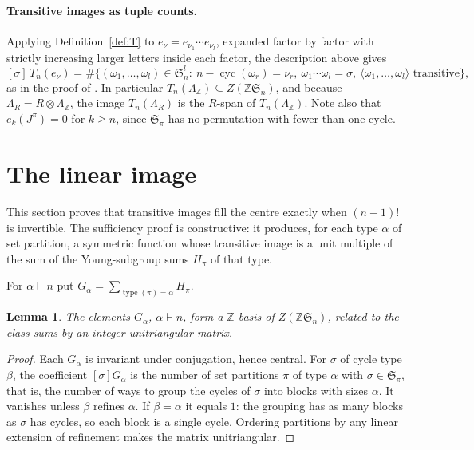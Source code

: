 \documentclass[11pt,a4paper]{article}
\newtheorem{lemma}[theorem]{Lemma}
\theoremstyle{definition}
\newcommand{\Sn}{\mathfrak S}
\newcommand{\Z}{\mathbb Z}
\DeclareMathOperator{\cyc}{cyc}
\DeclareMathOperator{\type}{type}
\begin{document}
\paragraph{Transitive images as tuple counts.} Applying Definition~\ref{def:T} to $e_\nu=e_{\nu_1}\cdots e_{\nu_l}$, expanded factor by factor with strictly increasing larger letters inside each factor, the description above gives
\begin{equation}\label{eq:count}
 [\sigma]\,T_n(e_\nu)=\#\bigl\{(\omega_1,\ldots,\omega_l)\in\Sn_n^l:\ n-\cyc(\omega_r)=\nu_r,\ \omega_1\cdots\omega_l=\sigma,\ \langle\omega_1,\ldots,\omega_l\rangle\text{ transitive}\bigr\},
\end{equation}
as in the proof of \cite[Theorem~6]{clr}. In particular $T_n(\Lambda_\Z)\subseteq Z(\Z\Sn_n)$, and because $\Lambda_R=R\otimes\Lambda_\Z$, the image $T_n(\Lambda_R)$ is the $R$-span of $T_n(\Lambda_\Z)$. Note also that $e_k(J^\pi)=0$ for $k\ge n$, since $\Sn_\pi$ has no permutation with fewer than one cycle.

\section{The linear image}\label{sec:linear}
This section proves that transitive images fill the centre exactly when $(n-1)!$ is invertible. The sufficiency proof is constructive: it produces, for each type $\alpha$ of set partition, a symmetric function whose transitive image is a unit multiple of the sum of the Young-subgroup sums $H_\pi$ of that type.

For $\alpha\vdash n$ put $G_\alpha=\sum_{\type(\pi)=\alpha}H_\pi$.

\begin{lemma}\label{lem:G}
The elements $G_\alpha$, $\alpha\vdash n$, form a $\Z$-basis of $Z(\Z\Sn_n)$, related to the class sums by an integer unitriangular matrix.
\end{lemma}
\begin{proof}
Each $G_\alpha$ is invariant under conjugation, hence central. For $\sigma$ of cycle type $\beta$, the coefficient $[\sigma]G_\alpha$ is the number of set partitions $\pi$ of type $\alpha$ with $\sigma\in\Sn_\pi$, that is, the number of ways to group the cycles of $\sigma$ into blocks with sizes $\alpha$. It vanishes unless $\beta$ refines $\alpha$. If $\beta=\alpha$ it equals $1$: the grouping has as many blocks as $\sigma$ has cycles, so each block is a single cycle. Ordering partitions by any linear extension of refinement makes the matrix unitriangular.
\end{proof}
\end{document}
